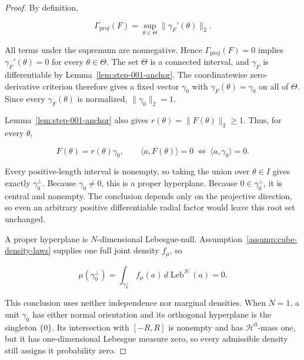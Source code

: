 \begin{proof}
By definition,

\begin{equation}
\label{eq:appendix-display-229}
\Gamma_{\mathrm{proj}}(F)
=\sup_{\theta\in\Theta}\lVert\gamma_F'(\theta)\rVert_2.
\end{equation}

All terms under the supremum are nonnegative. Hence
\(\Gamma_{\mathrm{proj}}(F)=0\) implies
\(\gamma_F'(\theta)=0\) for every \(\theta\in\Theta\). The set \(\Theta\) is a connected interval, and
\(\gamma_F\) is differentiable by Lemma~\ref{lem:step-001-anchor}. The coordinatewise
zero-derivative criterion therefore gives a fixed vector \(\gamma_0\) with
\(\gamma_F(\theta)=\gamma_0\) on all of \(\Theta\). Since every \(\gamma_F(\theta)\) is normalized,
\(\lVert\gamma_0\rVert_2=1\).

Lemma~\ref{lem:step-001-anchor} also gives
\(r(\theta)=\lVert F(\theta)\rVert_2\geq1\). Thus, for every \(\theta\),

\begin{equation}
\label{eq:appendix-display-230}
F(\theta)=r(\theta)\gamma_0,
\qquad
\langle a,F(\theta)\rangle=0
\ \Longleftrightarrow\
\langle a,\gamma_0\rangle=0.
\end{equation}

Every positive-length interval is nonempty, so taking the union over \(\theta\in I\) gives exactly
\(\gamma_0^\perp\). Because \(\gamma_0\neq0\), this is a proper hyperplane. Because \(0\in\gamma_0^\perp\),
it is central and nonempty. The conclusion depends only on the projective direction, so even an arbitrary
positive differentiable radial factor would leave this root set unchanged.

A proper hyperplane is \(N\)-dimensional Lebesgue-null. Assumption~\ref{assump:cube-density-laws} supplies one
full joint density \(f_\mu\), so

\begin{equation}
\label{eq:appendix-display-231}
\mu(\gamma_0^\perp)
=\int_{\gamma_0^\perp}f_\mu(a)\,d\operatorname{Leb}^N(a)
=0.
\end{equation}

This conclusion uses neither independence nor marginal densities. When \(N=1\), a unit
\(\gamma_0\) has either normal orientation and its orthogonal hyperplane is the singleton \(\{0\}\).
Its intersection with \([-R,R]\) is nonempty and has \(\mathcal H^0\)-mass one, but it has
one-dimensional Lebesgue measure zero, so every admissible density still assigns it probability zero.

\end{proof}

